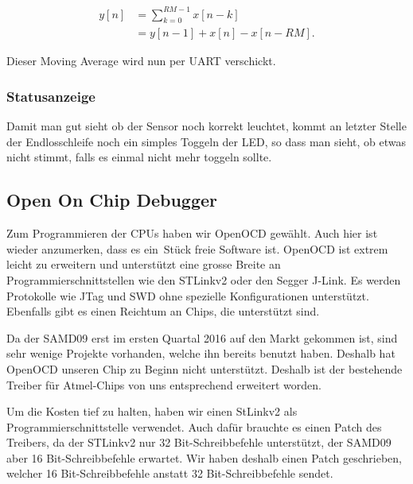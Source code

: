 \begin{equation}\label{eq:hogenauer}
    \begin{split}
        y[n] &= \sum_{k=0}^{RM-1} x[n-k] \\
             &= y[n-1] + x[n] - x[n-RM].
    \end{split}
\end{equation}

Dieser Moving Average wird nun per UART verschickt.

\subsubsection{Statusanzeige}
\label{subs:Statusanzeige}

Damit man  gut sieht  ob der  Sensor noch korrekt  leuchtet, kommt  an letzter
Stelle der Endlosschleife noch ein simples Toggeln der LED, so dass man sieht,
ob etwas nicht stimmt, falls es einmal nicht mehr toggeln sollte.

\subsection{Open On Chip Debugger}

Zum Programmieren der  CPUs haben wir OpenOCD gew\"ahlt. Auch  hier ist wieder
anzumerken, dass es ein St\"uck freie Software ist. OpenOCD ist extrem leicht
zu erweitern und unterst\"utzt eine grosse Breite an Programmierschnittstellen
wie den STLinkv2 oder den Segger J-Link. Es werden Protokolle wie JTag und SWD
ohne spezielle Konfigurationen unterst\"utzt. Ebenfalls gibt es einen Reichtum
an Chips, die unterst\"utzt sind.

Da der  SAMD09 erst im  ersten Quartal 2016 auf  den Markt gekommen  ist, sind
sehr wenige Projekte vorhanden, welche ihn bereits benutzt haben.  Deshalb hat
OpenOCD unseren Chip zu Beginn nicht unterst\"utzt. Deshalb ist der bestehende
Treiber f\"ur Atmel-Chips von uns entsprechend erweitert worden.


Um   die   Kosten   tief   zu   halten,   haben   wir   einen   StLinkv2   als
Programmierschnittstelle verwendet. Auch  daf\"ur brauchte es einen  Patch des
Treibers,  da  der  STLinkv2  nur  32  Bit-Schreibbefehle  unterst\"utzt,  der
SAMD09  aber 16  Bit-Schreibbefehle  erwartet. Wir haben  deshalb einen  Patch
geschrieben,  welcher  16  Bit-Schreibbefehle  anstatt  32  Bit-Schreibbefehle
sendet.
